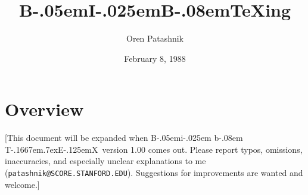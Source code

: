 %
%
%
%

\def\BibTeX{{\rm B\kern-.05em{\sc i\kern-.025em b}\kern-.08em
    T\kern-.1667em\lower.7ex\hbox{E}\kern-.125emX}}

\title{B\kern-.05em{\large I}\kern-.025em{\large B}\kern-.08em\TeX ing}
\author{Oren Patashnik}
\date{February 8, 1988}



\def\cite{\lexicite}


\lexiforcefoots

\maketitle

\section{Overview}

[This document will be expanded when \BibTeX\ version 1.00 comes out.
Please report typos, omissions, inaccuracies,
and especially unclear explanations
to me ({\tt patashnik@SCORE.STANFORD.EDU}).
Suggestions for improvements are wanted and welcome.]

